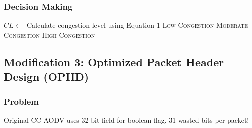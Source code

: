 \documentclass[12pt,a4paper]{article}
\begin{document}

\subsubsection{Decision Making}

\begin{algorithm}
\caption{QACD-based Route Decision}
\begin{algorithmic}[1]
\State $CL \gets$ Calculate congestion level using Equation 1
\State
{}
    \State \Return \textsc{Low Congestion} 
    \State \Return \textsc{Moderate Congestion} 
\Else
    \State \Return \textsc{High Congestion} 
\EndIf
\end{algorithmic}
\end{algorithm}

\subsection{Modification 3: Optimized Packet Header Design (OPHD)}

\subsubsection{Problem}
Original CC-AODV uses 32-bit field for boolean flag. 31 wasted bits per packet!
\end{document}
